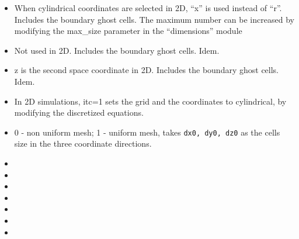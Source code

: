 \begin{itemize}
\item
{}
{When cylindrical coordinates are selected in 2D, ``x'' is used instead 
 of ``r''. Includes the boundary ghost cells. The maximum number can be 
 increased by modifying the max\_size parameter in the ``dimensions'' module}

\item
{}
{Not used in 2D. Includes the boundary ghost cells. Idem.}

\item
{}
{z is the second space coordinate in 2D. Includes the boundary ghost cells.
Idem. }

\item
{}
{In 2D simulations, itc=1 sets the grid and the coordinates to cylindrical,
by modifying the discretized equations.}

\item
{}
{0 - non uniform mesh; 1 - uniform mesh, takes {\tt dx0, dy0, dz0} as the
cells size in the three coordinate directions.}

\item
{}
{}

\item
{}
{}

\item
{}
{}

\item
{}
{}

\item
{}
{}

\item
{}
{}

\item
{}
{}

\end{itemize}


